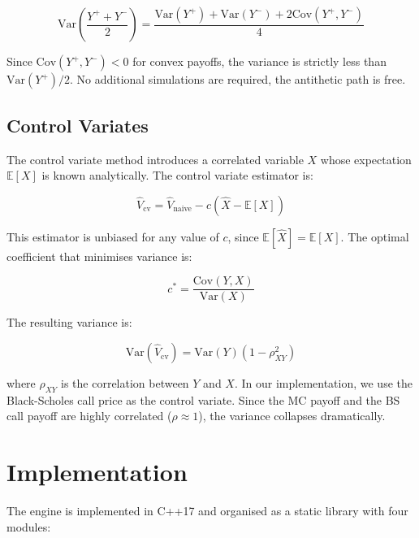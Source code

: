\documentclass[12pt]{article}
\begin{document}
\begin{equation}
    \text{Var}\left(\frac{Y^+ + Y^-}{2}\right) =
    \frac{\text{Var}(Y^+) + \text{Var}(Y^-) + 2\text{Cov}(Y^+, Y^-)}{4}
\end{equation}

Since $\text{Cov}(Y^+, Y^-) < 0$ for convex payoffs, the variance is
strictly less than $\text{Var}(Y^+)/2$. No additional simulations are
required, the antithetic path is free.

\subsection{Control Variates}

The control variate method introduces a correlated variable $X$ whose
expectation $\mathbb{E}[X]$ is known analytically. The control variate
estimator is:

\begin{equation}
    \hat{V}_{\text{cv}} = \hat{V}_{\text{naive}} - c({\hat{X} - \mathbb{E}[X]})
\end{equation}

This estimator is unbiased for any value of $c$, since
$\mathbb{E}[\hat{X}] = \mathbb{E}[X]$. The optimal coefficient that
minimises variance is:

\begin{equation}
    c^* = \frac{\text{Cov}(Y, X)}{\text{Var}(X)}
\end{equation}

The resulting variance is:

\begin{equation}
    \text{Var}(\hat{V}_{\text{cv}}) = \text{Var}(Y)(1 - \rho^2_{XY})
\end{equation}

where $\rho_{XY}$ is the correlation between $Y$ and $X$. In our
implementation, we use the Black-Scholes call price as the control variate.
Since the MC payoff and the BS call payoff are highly correlated
($\rho \approx 1$), the variance collapses dramatically.

\section{Implementation}

The engine is implemented in C++17 and organised as a static library with
four modules:
\end{document}
